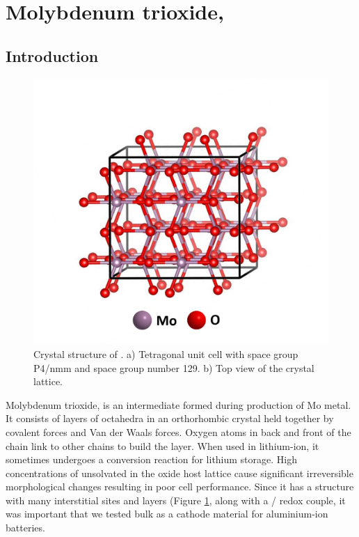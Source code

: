 \section{Molybdenum trioxide, }

\subsection{Introduction}

 \begin{figure}[th!]
  \centering
  \includegraphics[width=\textwidth]{Figures/chap6fig/MoO3crys}
    \caption{Crystal structure of . a) Tetragonal unit cell with space group P4/nmm and space group number 129. b) Top view of the crystal lattice.}
  \label{Figures/chap6fig:MoO3crys}
\end{figure}

Molybdenum trioxide,  is an intermediate formed during production of Mo metal. It consists of layers of  octahedra in an orthorhombic crystal held together by covalent forces and Van der Waals forces. Oxygen atoms in back and front of the chain link to other chains to build the layer. When used in lithium-ion, it sometimes undergoes a conversion reaction for lithium storage. High concentrations of unsolvated  in the oxide host lattice cause significant irreversible morphological changes resulting in poor cell performance.
Since it has a structure with many interstitial sites and layers (Figure \ref{Figures/chap6fig:MoO3crys}, along with a / redox couple, it was important that we tested bulk  as a cathode material for aluminium-ion batteries.


